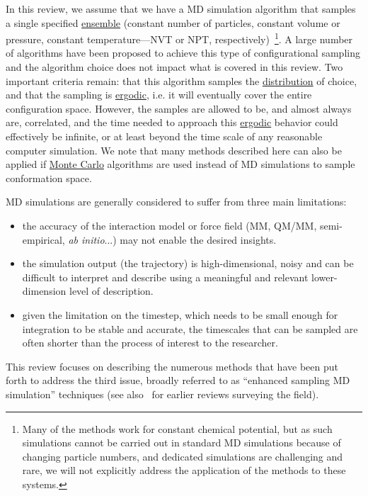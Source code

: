 \documentclass[9pt,review]{livecoms}
\begin{document}
In this review, we assume that we have a MD simulation algorithm that samples a single specified \hyperlink{ref:Ensemble} {ensemble} (constant number of particles, constant volume or pressure, constant temperature---NVT or NPT, respectively)~\footnote{Many of the methods work for constant chemical potential, but as such simulations cannot be carried out in standard MD simulations because of changing particle numbers, and dedicated simulations are challenging and rare, we will not explicitly address the application of the methods to these systems.}. A large number of algorithms have been proposed to achieve this type of configurational sampling and the algorithm choice does not impact what is covered in this review. Two important criteria remain: that this algorithm samples the \hyperlink{ref:Distribution} {distribution} of choice, and that the sampling is \hyperlink{ref:ergodic} {ergodic}, i.e. it will eventually cover the entire configuration space. However, the samples are allowed to be, and almost always are, correlated, and the time needed to approach this \hyperlink{ref:ergodic} {ergodic} behavior could effectively be infinite, or at least beyond the time scale of any reasonable computer simulation. We note that many methods described here can also be applied if \hyperlink{ref:MetropolisMonteCarlo} {Monte Carlo} algorithms are used instead of MD simulations to sample conformation space.

MD simulations are generally considered to suffer from three main limitations:
\begin{itemize}
    \item the accuracy of the interaction model or force field (MM, QM/MM, semi-empirical, \emph{ab initio}...) may not enable the desired insights.
    \item the simulation output (the trajectory) is high-dimensional, noisy and can be difficult to interpret and describe using a meaningful and relevant lower-dimension level of description.
    \item given the limitation on the timestep, which needs to be small enough for integration to be stable and accurate, the timescales that can be sampled are often shorter than the process of interest to the researcher.
\end{itemize}

This review focuses on describing the numerous methods that have been put forth to address the third issue, broadly referred to as ``enhanced sampling MD simulation'' techniques (see also~\cite{10.1016/j.bbagen.2014.10.019,10.1063/1.5109531,10.1039/d1cp04809k} for earlier reviews surveying the field).
\end{document}
